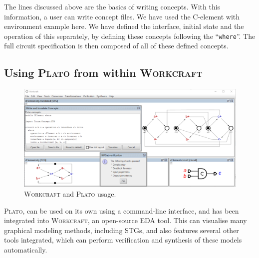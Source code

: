 \documentclass[british,conference,compsoc]{IEEEtran}
\newcommand{\noun}[1]{\textsc{#1}}
\begin{document}
\vspace{-1mm}

The lines discussed above are the basics of writing concepts. With this 
information, a user can write concept files. We have used the 
C-element with environment example here. We have defined the interface, initial 
state and the operation of this separately, by defining these concepts following the 
``\texttt{where}''. The full circuit specification is then 
composed of all of these defined concepts. 

\vspace{-4mm}

\subsection{Using \noun{Plato} from within \noun{Workcraft} \label{sec:workcraft_usage}}

\vspace{-4mm}

\begin{figure}[t]
\begin{centering}
\vspace{-3mm}
\includegraphics[scale=0.55]{Images/workcraft_design_flow.png}
\par\end{centering}
\begin{centering}
\protect\caption{\label{fig:design_flow_screenshot}\noun{Workcraft} and 
			\noun{Plato} usage.}
\par\end{centering}
\vspace{-3mm}
\end{figure}

\noun{Plato}, can be used on its own using a command-line interface, and has been
integrated into \noun{Workcraft}, an open-source EDA tool. This can visualise many graphical modeling
methods, including STGs, and also features several other tools integrated, which can perform verification
and synthesis of these models automatically.
\end{document}
